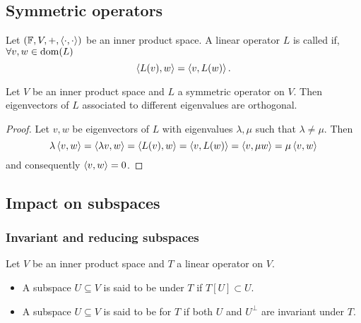 \subsection{Symmetric operators}
\begin{definition}
Let $(\mathbb{F},V,+,\left\langle \cdot,\cdot \right\rangle)$ be an inner product space. A linear operator $L$ is called  if, $\forall v,w\in \operatorname{dom}(L)$
\[ \left\langle L(v),w \right\rangle = \left\langle v,L(w) \right\rangle. \]
\end{definition}

\begin{proposition}
Let $V$ be an inner product space and $L$ a symmetric operator on $V$. Then eigenvectors of $L$ associated to different eigenvalues are orthogonal.
\end{proposition}
\begin{proof}
Let $v,w$ be eigenvectors of $L$ with eigenvalues $\lambda, \mu$ such that $\lambda \neq \mu$. Then
\[ \lambda\left\langle v,w \right\rangle = \left\langle \lambda v,w \right\rangle=\left\langle L(v),w \right\rangle = \left\langle v,L(w) \right\rangle = \left\langle v,\mu w \right\rangle = \mu \left\langle v,w \right\rangle \]
and consequently $\left\langle v,w \right\rangle =0$.
\end{proof}

\subsection{Impact on subspaces}
\subsubsection{Invariant and reducing subspaces}
\begin{definition}
Let $V$ be an inner product space and $T$ a linear operator on $V$.
\begin{itemize}
\item A subspace $U\subseteq V$ is said to be  under $T$ if $T[U] \subset U$.
\item A subspace $U\subseteq V$ is said to be  for $T$ if both $U$ and $U^\perp$ are invariant under $T$.
\end{itemize}
\end{definition}